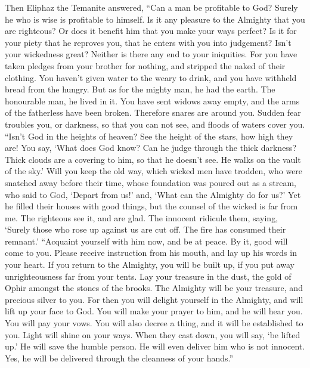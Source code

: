  Then Eliphaz the Temanite answered,  ``Can a
man be profitable to God? Surely he who is wise is profitable to
himself.  Is it any pleasure to the Almighty that you are
righteous? Or does it benefit him that you make your ways perfect?
 Is it for your piety that he reproves you, that he enters
with you into judgement?  Isn't your wickedness great?
Neither is there any end to your iniquities.  For you have
taken pledges from your brother for nothing, and stripped the naked of
their clothing.  You haven't given water to the weary to
drink, and you have withheld bread from the hungry.  But as
for the mighty man, he had the earth. The honourable man, he lived in
it.  You have sent widows away empty, and the arms of the
fatherless have been broken.  Therefore snares are around
you. Sudden fear troubles you,  or darkness, so that you
can not see, and floods of waters cover you.  ``Isn't God
in the heights of heaven? See the height of the stars, how high they
are!  You say, `What does God know? Can he judge through
the thick darkness?  Thick clouds are a covering to him, so
that he doesn't see. He walks on the vault of the sky.' 
Will you keep the old way, which wicked men have trodden, 
who were snatched away before their time, whose foundation was poured
out as a stream,  who said to God, `Depart from us!' and,
`What can the Almighty do for us?'  Yet he filled their
houses with good things, but the counsel of the wicked is far from me.
 The righteous see it, and are glad. The innocent ridicule
them,  saying, `Surely those who rose up against us are cut
off. The fire has consumed their remnant.'  ``Acquaint
yourself with him now, and be at peace. By it, good will come to you.
 Please receive instruction from his mouth, and lay up his
words in your heart.  If you return to the Almighty, you
will be built up, if you put away unrighteousness far from your tents.
 Lay your treasure in the dust, the gold of Ophir amongst
the stones of the brooks.  The Almighty will be your
treasure, and precious silver to you.  For then you will
delight yourself in the Almighty, and will lift up your face to God.
 You will make your prayer to him, and he will hear you.
You will pay your vows.  You will also decree a thing, and
it will be established to you. Light will shine on your ways.
 When they cast down, you will say, `be lifted up.' He will
save the humble person.  He will even deliver him who is
not innocent. Yes, he will be delivered through the cleanness of your
hands.''

